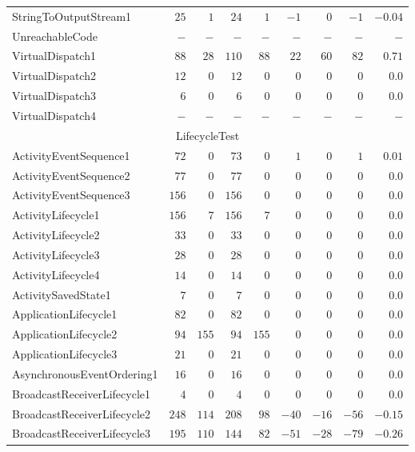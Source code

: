 \documentclass[../draft.tex]{subfiles}
\newcommand{\tsubEight}[1]{\multicolumn{9}{c}{#1}\\\hline}
\begin{document}
\begin{longtable}{l | r | r | r | r | r | r | r | r}
        StringToOutputStream1 & $25$ & $1$ & $24$ & $1$ & $-1$ & $0$ & $-1$ & $-0.04$\\
        UnreachableCode & $-$ & $-$ & $-$ & $-$ & $-$ & $-$ & $-$ & $-$\\
        VirtualDispatch1 & $88$ & $28$ & $110$ & $88$ & $22$ & $60$ & $82$ & $0.71$\\
        VirtualDispatch2 & $12$ & $0$ & $12$ & $0$ & $0$ & $0$ & $0$ & $0.0$\\
        VirtualDispatch3 & $6$ & $0$ & $6$ & $0$ & $0$ & $0$ & $0$ & $0.0$\\
        VirtualDispatch4 & $-$ & $-$ & $-$ & $-$ & $-$ & $-$ & $-$ & $-$\\
        \hline
        \tsubEight{LifecycleTest}
        ActivityEventSequence1 & $72$ & $0$ & $73$ & $0$ & $1$ & $0$ & $1$ & $0.01$\\
        ActivityEventSequence2 & $77$ & $0$ & $77$ & $0$ & $0$ & $0$ & $0$ & $0.0$\\
        ActivityEventSequence3 & $156$ & $0$ & $156$ & $0$ & $0$ & $0$ & $0$ & $0.0$\\
        ActivityLifecycle1 & $156$ & $7$ & $156$ & $7$ & $0$ & $0$ & $0$ & $0.0$\\
        ActivityLifecycle2 & $33$ & $0$ & $33$ & $0$ & $0$ & $0$ & $0$ & $0.0$\\
        ActivityLifecycle3 & $28$ & $0$ & $28$ & $0$ & $0$ & $0$ & $0$ & $0.0$\\
        ActivityLifecycle4 & $14$ & $0$ & $14$ & $0$ & $0$ & $0$ & $0$ & $0.0$\\
        ActivitySavedState1 & $7$ & $0$ & $7$ & $0$ & $0$ & $0$ & $0$ & $0.0$\\
        ApplicationLifecycle1 & $82$ & $0$ & $82$ & $0$ & $0$ & $0$ & $0$ & $0.0$\\
        ApplicationLifecycle2 & $94$ & $155$ & $94$ & $155$ & $0$ & $0$ & $0$ & $0.0$\\
        ApplicationLifecycle3 & $21$ & $0$ & $21$ & $0$ & $0$ & $0$ & $0$ & $0.0$\\
        AsynchronousEventOrdering1 & $16$ & $0$ & $16$ & $0$ & $0$ & $0$ & $0$ & $0.0$\\
        BroadcastReceiverLifecycle1 & $4$ & $0$ & $4$ & $0$ & $0$ & $0$ & $0$ & $0.0$\\
        BroadcastReceiverLifecycle2 & $248$ & $114$ & $208$ & $98$ & $-40$ & $-16$ & $-56$ & $-0.15$\\
        BroadcastReceiverLifecycle3 & $195$ & $110$ & $144$ & $82$ & $-51$ & $-28$ & $-79$ & $-0.26$\\

\end{longtable}
\end{document}
